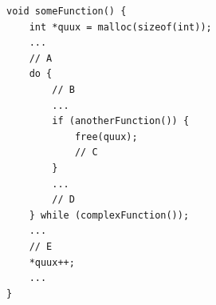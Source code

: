 \documentclass[tikz]{standalone}
\begin{document}
\begin{lrbox}{\uafCheckLoopCode}
\begin{lstlisting}
void someFunction() {
    int *quux = malloc(sizeof(int));
    ...
    // A
    do {
        // B
        ...
        if (anotherFunction()) {
            free(quux);
            // C
        }
        ...
        // D
    } while (complexFunction());
    ...
    // E
    *quux++;
    ...
}
\end{lstlisting}
\end{lrbox}







\end{document}
